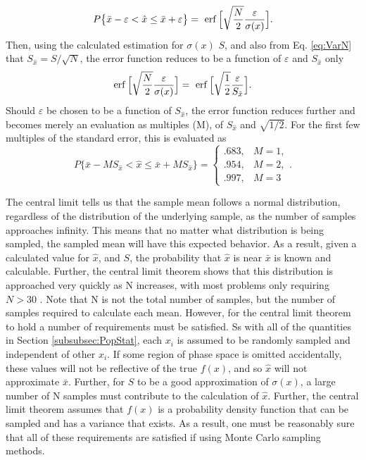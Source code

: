 \begin{equation}
  P\big\{\bar{x} - \varepsilon < \hat{x} \leq \bar{x} + \varepsilon\big\} = \
    \operatorname{erf}\Big[\sqrt{\frac{N}{2}} \frac{\varepsilon}{\sigma(x)}\Big].
\end{equation}
Then, using the calculated estimation for $\sigma(x)$ $S$, and also from Eq.
\eqref{eq:VarN} that $S_{\hat{x}}= S/\sqrt{N}$, the error function reduces to be
a function of $\varepsilon$ and $S_{\hat{x}}$ only
\begin{equation}
    \operatorname{erf}\Big[\sqrt{\frac{N}{2}} \frac{\varepsilon}{\sigma(x)}\Big] = \
    \operatorname{erf}\Big[\sqrt{\frac{1}{2}} \frac{\varepsilon}{S_{\hat{x}}}\Big] .
\end{equation}
Should $\varepsilon$ be chosen to be a function of $S_{\hat{x}}$, the error
function reduces further and becomes merely an evaluation as multiples (M), of
$S_{\hat{x}}$ and $\sqrt{1/2}$. For the first few multiples of the standard
error, this is evaluated as
\begin{equation}
  P\big\{\bar{x} - M S_{\hat{x}} < \hat{x} \leq \bar{x} + M S_{\hat{x}} \big\} =
  \begin{cases}
    .683, & M = 1, \\
    .954, & M = 2, \\
    .997, & M = 3
  \end{cases}  .
\end{equation}

The central limit tells us that the sample mean follows a normal
distribution, regardless of the distribution of the underlying sample, as the
number of samples approaches infinity. This
means that no matter what distribution is being sampled, the sampled mean will
have this expected behavior. As a result, given a calculated value for
$\hat{x}$, and $S$, the probability that $\hat{x}$ is near $\bar{x}$ is known
and calculable.
Further, the central limit theorem shows that this distribution is approached
very quickly as N increases, with most problems only requiring $N > 30$
\cite{lewis_computational_1984}. Note
that N is not the total number of samples, but the number of samples required to
calculate each mean.
However, for the central limit theorem to hold a number of
requirements must be satisfied. Ss with all of the quantities in Section
\ref{subsubsec:PopStat}, each $x_i$ is assumed to be randomly sampled and
independent of other $x_i$. If some region of phase space is omitted
accidentally, these values will not be reflective of the true $f(x)$, and so
$\hat{x}$ will not approximate $\bar{x}$. Further, for $S$ to be a
good approximation of $\sigma(x)$, a large number of N samples must contribute
to the calculation of $\hat{x}$. Further, the central limit theorem assumes that
$f(x)$ is a probability density function that can be sampled and has a variance
that exists. As a result, one must be reasonably sure that all of these
requirements are satisfied if using Monte Carlo sampling methods.

